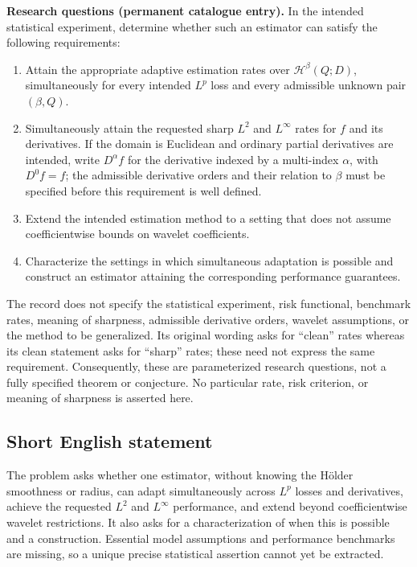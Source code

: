 \documentclass[11pt]{article}
\begin{document}
\textbf{Research questions (permanent catalogue entry).} In the intended statistical experiment, determine whether such an estimator can satisfy the following requirements:
\begin{enumerate}
\item Attain the appropriate adaptive estimation rates over \(\mathcal H^\beta(Q;D)\), simultaneously for every intended \(L^p\) loss and every admissible unknown pair \((\beta,Q)\).
\item Simultaneously attain the requested sharp \(L^2\) and \(L^\infty\) rates for \(f\) and its derivatives. If the domain is Euclidean and ordinary partial derivatives are intended, write \(D^\alpha f\) for the derivative indexed by a multi-index \(\alpha\), with \(D^0f=f\); the admissible derivative orders and their relation to \(\beta\) must be specified before this requirement is well defined.
\item Extend the intended estimation method to a setting that does not assume coefficientwise bounds on wavelet coefficients.
\item Characterize the settings in which simultaneous adaptation is possible and construct an estimator attaining the corresponding performance guarantees.
\end{enumerate}
The record does not specify the statistical experiment, risk functional, benchmark rates, meaning of sharpness, admissible derivative orders, wavelet assumptions, or the method to be generalized. Its original wording asks for ``clean'' rates whereas its clean statement asks for ``sharp'' rates; these need not express the same requirement. Consequently, these are parameterized research questions, not a fully specified theorem or conjecture. No particular rate, risk criterion, or meaning of sharpness is asserted here.
\subsection{Short English statement}
The problem asks whether one estimator, without knowing the H\"older smoothness or radius, can adapt simultaneously across \(L^p\) losses and derivatives, achieve the requested \(L^2\) and \(L^\infty\) performance, and extend beyond coefficientwise wavelet restrictions. It also asks for a characterization of when this is possible and a construction. Essential model assumptions and performance benchmarks are missing, so a unique precise statistical assertion cannot yet be extracted.
\end{document}
